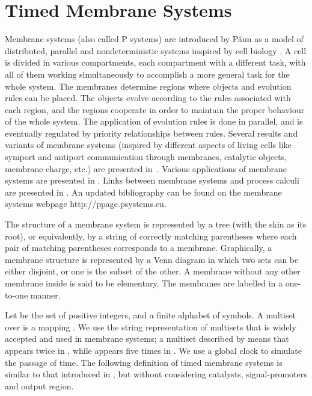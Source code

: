 \documentclass{eptcs}
\begin{document}
\section{Timed Membrane Systems}
\label{section:timed_symanti}

Membrane systems (also called P systems) are introduced by P\u aun as a
model of distributed, parallel and nondeterministic systems inspired by
cell biology \cite{Paun02}. A cell is divided in various compartments, each
compartment with a different task, with all of them working simultaneously
to accomplish a more general task for the whole system. The membranes
determine regions where objects and evolution rules can be placed. The
objects evolve according to the rules associated with each region, and the
regions cooperate in order to maintain the proper behaviour of the whole
system. The application of evolution rules is done in parallel, and is
eventually regulated by priority relationships between rules. Several
results and variants of membrane systems (inspired by different aspects of
living cells like symport and antiport communication through membranes,
catalytic objects, membrane charge, etc.) are presented in~\cite{Paun02}.
Various applications of membrane systems are presented in \cite{Ciobanu06}.
Links between membrane systems and process calculi are presented in
\cite{Ciobanu10}. An updated bibliography can be found on the membrane
systems webpage {\sf http://ppage.psystems.eu}.

The structure of a membrane system is represented by a tree (with the skin as
its root), or equivalently, by a string of correctly matching parentheses where
each pair of matching parentheses corresponds to a membrane. Graphically, a
membrane structure is represented by a Venn diagram in which two sets can be
either disjoint, or one is the subset of the other. A membrane without any other
membrane inside is said to be elementary. The membranes are labelled in a
one-to-one manner.

Let  be the set of positive integers, and  a finite alphabet of
symbols. A multiset over  is a mapping . We use the
string representation of multisets that is widely accepted and used in membrane
systems; a multiset  described by  means that  appears twice in
, while  appears five times in . We use a global clock to simulate the
passage of time. The following definition of timed membrane systems is similar
to that introduced in \cite{Cavaliere05}, but without considering catalysts,
signal-promoters and output region.
\end{document}
